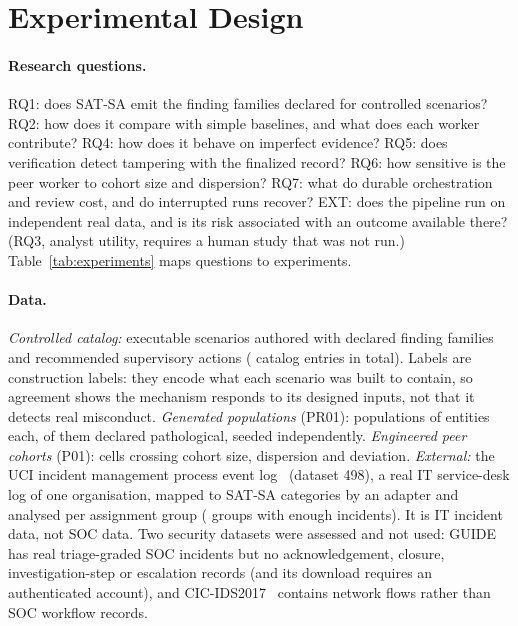 \section{Experimental Design}
\label{sec:design}

\paragraph{Research questions.}
RQ1: does SAT-SA emit the finding families declared for controlled scenarios?
RQ2: how does it compare with simple baselines, and what does each worker
contribute? RQ4: how does it behave on imperfect evidence? RQ5: does verification
detect tampering with the finalized record? RQ6: how sensitive is the peer worker
to cohort size and dispersion? RQ7: what do durable orchestration and review cost,
and do interrupted runs recover? EXT: does the pipeline run on independent real
data, and is its risk associated with an outcome available there? (RQ3, analyst
utility, requires a human study that was not run.) Table~\ref{tab:experiments}
maps questions to experiments.



\paragraph{Data.}
\emph{Controlled catalog:}  executable scenarios authored
with declared finding families and recommended supervisory actions
( catalog entries in total). Labels are construction labels:
they encode what each scenario was built to contain, so agreement shows the
mechanism responds to its designed inputs, not that it detects real misconduct.
\emph{Generated populations} (PR01):  populations of
 entities each,  of them declared
pathological, seeded independently. \emph{Engineered peer cohorts} (P01):
 cells crossing cohort size, dispersion and deviation.
\emph{External:} the UCI incident management process event log~\citep{amaral2018uci498}
(dataset 498), a real IT service-desk log of one organisation, mapped to SAT-SA
categories by an adapter and analysed per assignment group
( groups with enough incidents). It is IT incident data, not SOC
data. Two security datasets were assessed and not used: GUIDE~\citep{freitas2024guide}
has real triage-graded SOC incidents but no acknowledgement, closure,
investigation-step or escalation records (and its download requires an
authenticated account), and CIC-IDS2017~\citep{sharafaldin2018cicids} contains
network flows rather than SOC workflow records.

